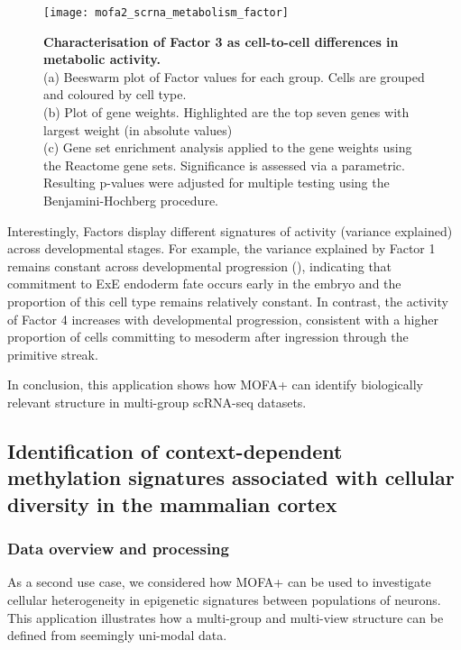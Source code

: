 \begin{figure}[H]
	\centering
	\texttt{[image: mofa2\_scrna\_metabolism\_factor]}
	\caption[]{\textbf{Characterisation of Factor 3 as cell-to-cell differences in metabolic activity.} \\
	(a) Beeswarm plot of Factor values for each group. Cells are grouped and coloured by cell type. \\
	(b) Plot of gene weights. Highlighted are the top seven genes with largest weight (in absolute values) \\
	(c) Gene set enrichment analysis applied to the gene weights using the Reactome gene sets\cite{Fabregat2015}. Significance is assessed via a parametric. Resulting p-values were adjusted for multiple testing using the Benjamini-Hochberg procedure.
	}
	\label{fig:mofa2_scrna_metabolism_factor}
\end{figure}

Interestingly, Factors display different signatures of activity (variance explained) across developmental stages. For example, the variance explained by Factor 1 remains constant across developmental progression (), indicating that commitment to ExE endoderm fate occurs early in the embryo and the proportion of this cell type remains relatively constant. In contrast, the activity of Factor 4 increases with developmental progression, consistent with a higher proportion of cells committing to mesoderm after ingression through the primitive streak. 

In conclusion, this application shows how MOFA+ can identify biologically relevant structure in multi-group scRNA-seq datasets.


\subsection{Identification of context-dependent methylation signatures associated with cellular diversity in the mammalian cortex}

\subsubsection{Data overview and processing}

As a second use case, we considered how MOFA+ can be used to investigate cellular heterogeneity  in epigenetic signatures between populations of neurons. This application illustrates how a multi-group and multi-view structure can be defined from seemingly uni-modal data.

